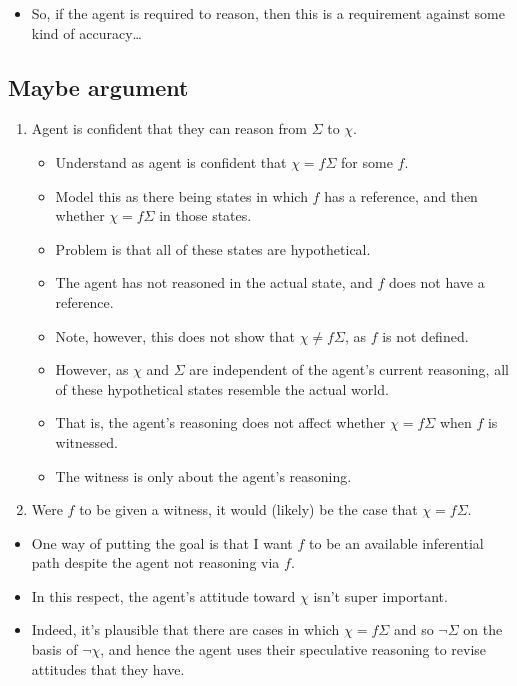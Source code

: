 \documentclass[10pt]{article}
\begin{document}
\begin{itemize}
\item So, if the agent is required to reason, then this is a requirement against some kind of accuracy\dots
\end{itemize}

\subsection{Maybe argument}
\label{sec:maybe-argument}

\begin{enumerate}
\item Agent is confident that they can reason from \(\Sigma\) to \(\chi\).
  \begin{itemize}
  \item Understand as agent is confident that \(\chi = f\Sigma\) for some \(f\).
  \item Model this as there being states in which \(f\) has a reference, and then whether \(\chi = f\Sigma\) in those states.
  \item Problem is that all of these states are hypothetical.
  \item The agent has not reasoned in the actual state, and \(f\) does not have a reference.
  \item Note, however, this does not show that \(\chi \ne f\Sigma\), as \(f\) is not defined.
  \item However, as \(\chi\) and \(\Sigma\) are independent of the agent's current reasoning, all of these hypothetical states resemble the actual world.
  \item That is, the agent's reasoning does not affect whether \(\chi = f\Sigma\) when \(f\) is witnessed.
  \item The witness is only about the agent's reasoning.
  \end{itemize}
\item Were \(f\) to be given a witness, it would (likely) be the case that \(\chi = f\Sigma\).
\end{enumerate}

\begin{itemize}
\item One way of putting the goal is that I want \(f\) to be an available inferential path despite the agent not reasoning via \(f\).
\item In this respect, the agent's attitude toward \(\chi\) isn't super important.
\item Indeed, it's plausible that there are cases in which \(\chi = f\Sigma\) and so \(\lnot\Sigma\) on the basis of \(\lnot\chi\), and hence the agent uses their speculative reasoning to revise attitudes that they have.
\end{itemize}
\end{document}
